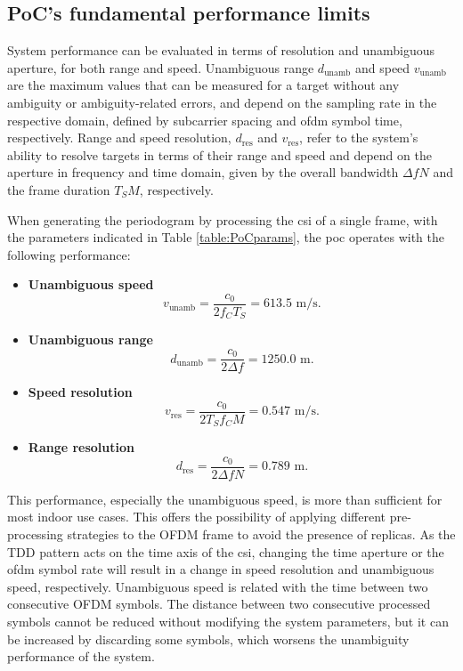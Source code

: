 	\subsection{PoC's fundamental performance limits}
		
		System performance can be evaluated in terms of resolution and unambiguous aperture, for both range and speed.
		Unambiguous range $d_{\text{unamb}}$ and speed $v_{\text{unamb}}$ are the maximum values that can be measured for a target without any ambiguity or ambiguity-related errors, and depend on the sampling rate in the respective domain, defined by subcarrier spacing and \gls{ofdm} symbol time, respectively.
		Range and speed resolution, $d_{\text{res}}$ and $v_{\text{res}}$, refer to the system's ability to resolve targets in terms of their range and speed and depend on the aperture in frequency and time domain, given by the overall bandwidth $\Delta f N$ and the frame duration $T_S M$, respectively. 
	
		When generating the periodogram by processing the \gls{csi} of a single frame, with the parameters indicated in Table \ref{table:PoCparams},
		the \gls{poc} operates with the following performance:
		
		\begin{itemize}
			\item \textbf{Unambiguous speed}
			\vspace{-\baselineskip} %
			\begin{equation}
				v_{\text{unamb}} = \frac{c_0}{2f_C T_S} = 613.5\text{ m/s}.
			\end{equation}
			
			\item \textbf{Unambiguous range}
			\begin{equation}
				d_{\text{unamb}} = \frac{c_0}{2\Delta f} = 1250.0\text{ m}.
			\end{equation}
			\item \textbf{Speed resolution}
			\begin{equation}
				v_{\text{res}} = \frac{c_0}{2T_Sf_CM} = 0.547 \text{ m/s}.
			\end{equation} 
			\item \textbf{Range resolution}
			\begin{equation}
				d_{\text{res}} = \frac{c_0}{2\Delta fN} = 0.789 \text{ m}.
			\end{equation}  
		\end{itemize}
			This performance, especially the unambiguous speed, is more than sufficient for most indoor use cases. 
			This offers the possibility of applying different pre-processing strategies to the OFDM frame to avoid the presence of replicas. 
			As the TDD pattern acts on the time axis of the \gls{csi}, changing the time aperture or the \gls{ofdm} symbol rate will result in a change in speed resolution and unambiguous speed, respectively.
			Unambiguous speed is related with the time between two consecutive OFDM symbols. The distance between two consecutive processed symbols cannot be reduced without modifying the system parameters, but it can be increased by discarding some symbols, which worsens the unambiguity performance of the system.
			
